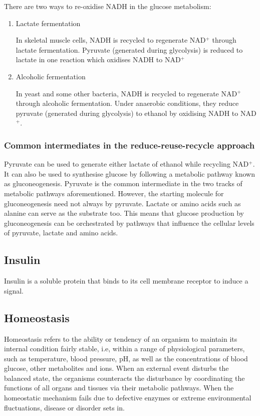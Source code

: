 \documentclass[11pt]{article}
\begin{document}
There are two ways to re-oxidise NADH in the glucose metabolism:
\begin{enumerate}
\item Lactate fermentation
\label{sec:org8c3bffa}

In skeletal muscle cells, NADH is recycled to regenerate NAD\(^+\) through lactate fermentation. Pyruvate (generated during glycolysis) is reduced to lactate in one reaction which oxidises NADH to NAD\(^+\)
\item Alcoholic fermentation
\label{sec:org71ea2e3}

In yeast and some other bacteria, NADH is recycled to regenerate NAD\(^+\) through alcoholic fermentation. Under anaerobic conditions, they reduce pyruvate (generated during glycolysis) to ethanol by oxidising NADH to NAD\(^+\).
\end{enumerate}
\subsubsection{Common intermediates in the reduce-reuse-recycle approach}
\label{sec:orge82c19b}
Pyruvate can be used to generate either lactate of ethanol while recycling NAD\(^+\). It can also be used to synthesise glucose by following a metabolic pathway known as gluconeogenesis. Pyruvate is the common intermediate in the two tracks of metabolic pathways aforementioned. However, the starting molecule for gluconeogenesis need not always by pyruvate. Lactate or amino acids such as alanine can serve as the substrate too. This means that glucose production by gluconeogenesis can be orchestrated by pathways that influence the cellular levels of pyruvate, lactate and amino acids.

\newpage
\subsection{Insulin}
\label{sec:org872854a}
Insulin is a soluble protein that binds to its cell membrane receptor to induce a signal.
\subsection{Homeostasis}
\label{sec:org0cb1b90}
Homeostasis refers to the ability or tendency of an organism to maintain its internal condition fairly stable, i.e, within a range of physiological parameters, such as temperature, blood pressure, pH, as well as the concentrations of blood glucose, other metabolites and ions. When an external event disturbs the balanced state, the organisms counteracts the disturbance by coordinating the functions of all organs and tissues via their metabolic pathways. When the homeostatic mechanism fails due to defective enzymes or extreme environmental fluctuations, disease or disorder sets in.
\end{document}
